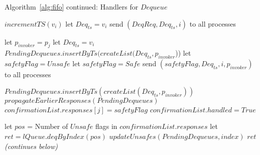 \documentclass[a4paper,USenglish]{lipics-v2021} %
\begin{document}
\begin{algorithm}
  \caption{Algorithm~\ref{alg:fifo} continued: Handlers for $Dequeue$}
  \begin{algorithmic}[1]
      \State $incrementTS(v_i)$
      \State let $Deq_{ts} = v_i$
      \State send $(DeqReq, Deq_{ts}, i)$ to all processes
    \EndFunction

    \State let $p_{invoker} = p_j$
      \State let $Deq_{ts} = v_i$
      \State $PendingDequeues.insertByTs(createList(Deq_{ts}, p_{invoker}$))
      \EndIf
        \State let $safetyFlag = Unsafe$
      \Else
        \State let $safetyFlag = Safe$
      \EndIf
      \State send $(safetyFlag, Deq_{ts}, i, p_{invoker})$ to all processes
    \EndFunction

        \State $PendingDequeues.insertByTs(createList(Deq_{ts}, p_{invoker}))$
      \EndIf
      \State $propagateEarlierResponses(PendingDequeues)$ 
          \State $confirmationList.responses[j] = safetyFlag$
        \EndIf 
          \State $confirmationList.handled = True$ 

          \State let $pos$ = Number of $Unsafe$ flags in $confirmationList.responses$
          \State let $ret = lQueue.deqByIndex(pos)$
          \State $updateUnsafes(PendingDequeues, \textit{index})$
            \State \Return $ret$
          \EndIf
        \EndIf 
      \EndFor
      \EndFunction
      \Statex
      \Statex \emph{(continues below)}

  \end{algorithmic}
\end{algorithm}
\end{document}
